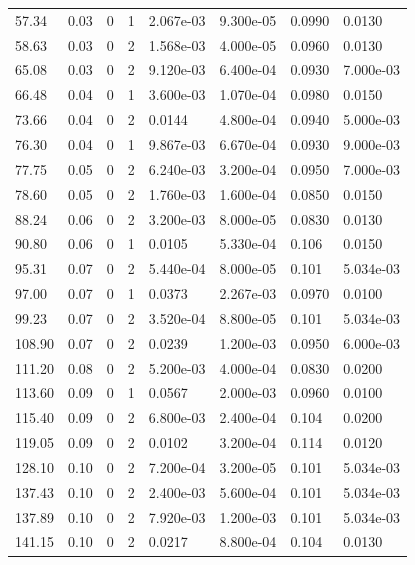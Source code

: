 \documentclass[preview]{standalone}
\begin{document}
{{\begin{tabular}{L{1.2cm}C{1.2cm} C{0.3cm}C{0.5cm} C{1.4cm}C{1.4cm} C{1.4cm}C{1.4cm}}
  57.34  &  0.03  & 0     &  1 &  2.067e-03  & 9.300e-05  & 0.0990 &  0.0130   \\ 
  58.63  &  0.03  & 0     &  2 &  1.568e-03  & 4.000e-05  & 0.0960 &  0.0130   \\ 
  65.08  &  0.03  & 0     &  2 &  9.120e-03  & 6.400e-04  & 0.0930 &  7.000e-03   \\ 
  66.48  &  0.04  & 0     &  1 &  3.600e-03  & 1.070e-04  & 0.0980 &  0.0150   \\ 
  73.66  &  0.04  & 0     &  2 &  0.0144  & 4.800e-04  & 0.0940 &  5.000e-03   \\ 
  76.30  &  0.04  & 0     &  1 &  9.867e-03  & 6.670e-04  & 0.0930 &  9.000e-03   \\ 
  77.75  &  0.05  & 0     &  2 &  6.240e-03  & 3.200e-04  & 0.0950 &  7.000e-03   \\ 
  78.60  &  0.05  & 0     &  2 &  1.760e-03  & 1.600e-04  & 0.0850 &  0.0150   \\ 
  88.24  &  0.06  & 0     &  2 &  3.200e-03  & 8.000e-05  & 0.0830 &  0.0130   \\ 
  90.80  &  0.06  & 0     &  1 &  0.0105  & 5.330e-04  & 0.106 &  0.0150   \\ 
  95.31  &  0.07  & 0     &  2 &  5.440e-04  & 8.000e-05  & 0.101 &  5.034e-03   \\ 
  97.00  &  0.07  & 0     &  1 &  0.0373  & 2.267e-03  & 0.0970 &  0.0100   \\ 
  99.23  &  0.07  & 0     &  2 &  3.520e-04  & 8.800e-05  & 0.101 &  5.034e-03   \\ 
  108.90  &  0.07  & 0     &  2 &  0.0239  & 1.200e-03  & 0.0950 &  6.000e-03   \\ 
  111.20  &  0.08  & 0     &  2 &  5.200e-03  & 4.000e-04  & 0.0830 &  0.0200   \\ 
  113.60  &  0.09  & 0     &  1 &  0.0567  & 2.000e-03  & 0.0960 &  0.0100   \\ 
  115.40  &  0.09  & 0     &  2 &  6.800e-03  & 2.400e-04  & 0.104 &  0.0200   \\ 
  119.05  &  0.09  & 0     &  2 &  0.0102  & 3.200e-04  & 0.114 &  0.0120   \\ 
  128.10  &  0.10  & 0     &  2 &  7.200e-04  & 3.200e-05  & 0.101 &  5.034e-03   \\ 
  137.43  &  0.10  & 0     &  2 &  2.400e-03  & 5.600e-04  & 0.101 &  5.034e-03   \\ 
  137.89  &  0.10  & 0     &  2 &  7.920e-03  & 1.200e-03  & 0.101 &  5.034e-03   \\ 
  141.15  &  0.10  & 0     &  2 &  0.0217  & 8.800e-04  & 0.104 &  0.0130   \\ 

\end{tabular}}}
\end{document}
